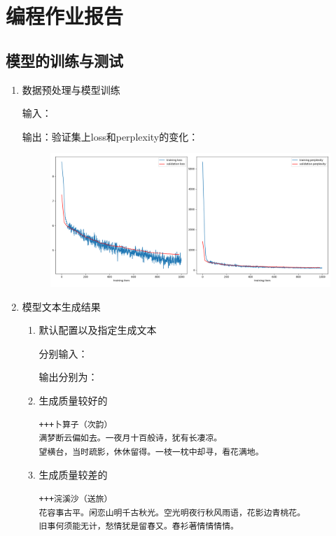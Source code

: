 \documentclass[a4paper]{article}
\begin{document}
\section{编程作业报告}
\subsection{模型的训练与测试}
\begin{enumerate}
    \item 数据预处理与模型训练
    
    输入：
    

    输出：验证集上loss和perplexity的变化：
    \begin{figure}[H]
        \centering
        \includegraphics[width=0.9\linewidth]{../img/1.png}
    \end{figure}


    \item 模型文本生成结果
    
    \begin{enumerate}
        \item 默认配置以及指定生成文本
        
        分别输入：
        

        输出分别为：
        

        \item 生成质量较好的
        
        \begin{lstlisting}
+++卜算子（次韵）
满梦断云偏如去。一夜月十百般诗，犹有长凄凉。
望横台，当时疏影，休休留得。一枝一枕中却寻，看花满地。
        \end{lstlisting}

        \item 生成质量较差的
        
        \begin{lstlisting}
+++浣溪沙（送旅）
花容事古平。闲恋山明千古秋光。空光明夜行秋风雨语，花影边青桃花。
旧事何须能无计，愁情犹是留春又。春衫著情情情情。
        \end{lstlisting}
    \end{enumerate}
\end{enumerate}
\end{document}
